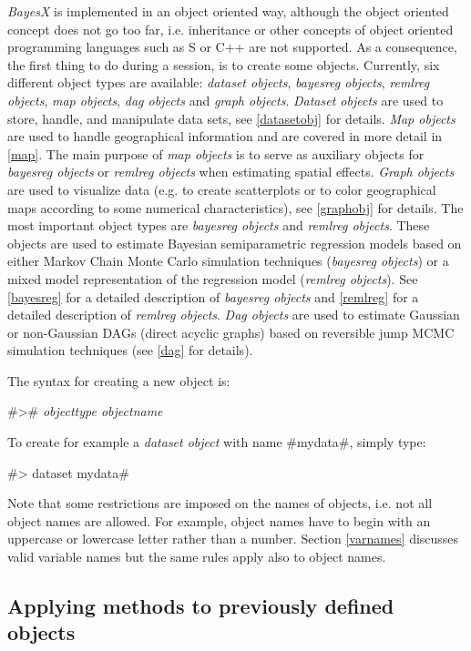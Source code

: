 {\em BayesX} is implemented in an object oriented way, although
the object oriented concept does not go too far, i.e. inheritance
or other concepts of object oriented programming languages such as
S or C++ are not supported. As a consequence, the first thing to
do during a session, is to create some objects. Currently, six
different object types are available: {\em dataset objects}, {\em
bayesreg objects}, {\em remlreg objects}, {\em map objects}, {\em
dag objects} and {\em graph objects}. {\em Dataset objects} are
used to store, handle, and manipulate data sets, see
\autoref{datasetobj} for details. {\em Map objects} are used to
handle geographical information and are covered in more detail in
\autoref{map}. The main purpose of {\em map objects} is to serve
as auxiliary objects for {\em bayesreg objects} or {\em remlreg
objects} when estimating spatial effects. {\em Graph objects} are
used to visualize data (e.g. to create scatterplots or to color
geographical maps according to some numerical characteristics),
see \autoref{graphobj} for details. The most important object
types are {\em bayesreg objects} and {\em remlreg objects}. These
objects are used to estimate Bayesian semiparametric regression
models based on either Markov Chain Monte Carlo simulation
techniques ({\em bayesreg objects}) or a mixed model
representation of the regression model ({\em remlreg objects}).
See \autoref{bayesreg} for a detailed description of {\em bayesreg
objects} and \autoref{remlreg} for a detailed description of {\em
remlreg objects}. {\em Dag objects} are used to estimate Gaussian
or non-Gaussian DAGs (direct acyclic graphs) based on reversible
jump MCMC simulation techniques (see \autoref{dag} for details).

The syntax for creating a new object is:

#># {\em objecttype objectname}

To create for example a {\em dataset object} with name #mydata#, simply type:

#> dataset mydata#

Note that some restrictions are imposed on the names of objects,
i.e. not all object names are allowed. For example, object names
have to begin with an uppercase or lowercase letter rather than a
number. Section \ref{varnames} discusses valid variable names but
the same rules apply also to object names.

\subsection{Applying methods to previously defined objects}

